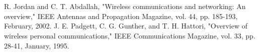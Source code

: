 \chapter*{\makebox[\textwidth][l]{\bibname}}

\begingroup
\renewcommand{\chapter}[2]{}  %
\begin{thebibliography}{9}
     R. Jordan and C. T. Abdallah, "Wireless communications and networking: An overview," IEEE Antennas and Propagation Magazine, vol. 44, pp. 185-193, February, 2002.
     J. E. Padgett, C. G. Gunther, and T. H. Hattori, "Overview of wireless personal communications," IEEE Communications Magazine, vol. 33, pp. 28-41, January, 1995.
\end{thebibliography}
\endgroup